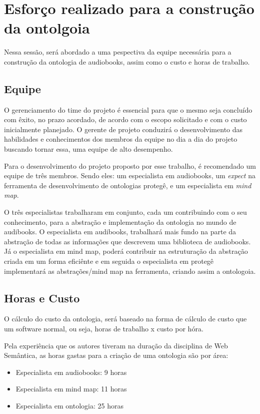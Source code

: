 \section{Esforço realizado para a construção da ontolgoia}

Nessa sessão, será abordado a uma pespectiva da equipe necessária para a construção da ontologia de audiobooks, assim como o custo e horas de trabalho.

\subsection{Equipe}

O gerenciamento do time do projeto é essencial para que o mesmo seja concluído com êxito, no prazo acordado, de acordo com o escopo solicitado e com o custo inicialmente planejado. O gerente de projeto conduzirá o desenvolvimento das habilidades e conhecimentos dos membros da equipe no dia a dia do projeto buscando tornar essa, uma equipe de alto desempenho. \cite{CHIAVENATO}

Para o desenvolvimento do projeto proposto por esse trabalho, é recomendado um equipe de três membros. Sendo eles: um especialista em audiobooks, um \textit{expect} na ferramenta de desenvolvimento de ontologias protegê, e um especialista em \textit{mind map}.

O três especialistas trabalharam em conjunto, cada um contribuindo com o seu conhecimento, para a abstração e implementação da ontologia no mundo de audibooks.
O especialista em audibooks, trabalhará mais fundo na parte da abstração de todas as informações que descrevem uma biblioteca de audiobooks. 
Já o especialista em mind map, poderá contribuir na estruturação da abstração criada em um forma eficiênte e em seguida o especialista em protegê implementará as abstrações/mind map na ferramenta, criando assim a ontologoia.

\subsection{Horas e Custo}

O cálculo do custo da ontologia, será baseado na forma de cálculo de custo que um software normal, ou seja, horas de trabalho x custo por hóra.

Pela experiência que os autores tiveram na duração da disciplina de Web Semântica, as horas gastas para a criação de uma ontologia são por área:

\begin{itemize}
	\item Especialista em audiobooks: 9 horas
	\item Especialista em mind map: 11 horas
	\item Especialista em ontologia: 25 horas
\end{itemize}

